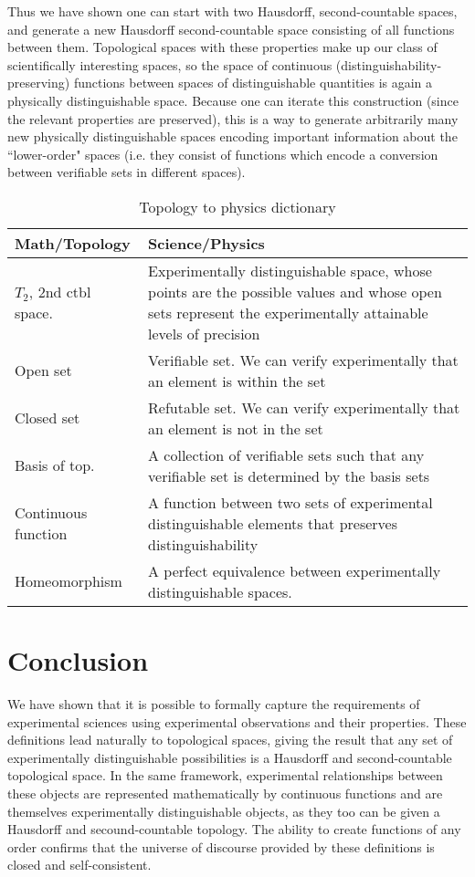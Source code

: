 \documentclass[review]{elsarticle}
\theoremstyle{plain}%
\theoremstyle{definition}
\theoremstyle{remark}
\begin{document}
Thus we have shown one can start with two Hausdorff, second-countable spaces, and generate a new Hausdorff second-countable space consisting of all functions between them. Topological spaces with these properties make up our class of scientifically interesting spaces, so the space of continuous (distinguishability-preserving) functions between spaces of distinguishable quantities is again a physically distinguishable space. Because one can iterate this construction (since the relevant properties are preserved), this is a way to generate arbitrarily many new physically distinguishable spaces encoding important information about the ``lower-order" spaces (i.e. they consist of functions which encode a conversion between verifiable sets in different spaces).

\begin{table}[h]
	\centering
	\begin{tabular}{p{} p{}}
		Math/Topology & Science/Physics \\ 
		\hline 
		$T_2$, 2nd ctbl space. & Experimentally distinguishable space, whose points are the possible values and whose open sets represent the experimentally attainable levels of precision \\
		Open set & Verifiable set. We can verify experimentally that an element is within the set  \\ 
		Closed set & Refutable set. We can verify experimentally that an element is not in the set \\ 
		Basis of top. & A collection of verifiable sets such that any verifiable set is determined by the basis sets\\
		Continuous \newline function &  A function between two sets of experimental distinguishable elements that preserves distinguishability \\
		Homeomorphism &  A perfect equivalence between experimentally distinguishable spaces. \\
	\end{tabular} 
	\caption{Topology to physics dictionary}
\end{table}


\section{Conclusion}

We have shown that it is possible to formally capture the requirements of experimental sciences using experimental observations and their properties. These definitions lead naturally to topological spaces, giving the result that any set of experimentally distinguishable possibilities is a Hausdorff and second-countable topological space. In the same framework, experimental relationships between these objects are represented mathematically by continuous functions and are themselves experimentally distinguishable objects, as they too can be given a Hausdorff and secound-countable topology. The ability to create functions of any order confirms that the universe of discourse provided by these definitions is closed and self-consistent.
\end{document}
